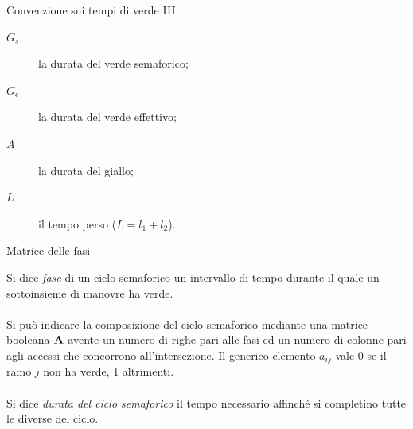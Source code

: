 \documentclass{beamer}
\begin{document}
\begin{frame}{Convenzione sui tempi di verde III}
\begin{description}
	\item[$G_s$] la durata del verde semaforico;
	\item[$G_e$] la durata del verde effettivo;
	\item[$A$] la durata del giallo;
	\item[$L$] il tempo perso ($L=l_1+l_2$).
\end{description}
\end{frame}

\begin{frame}{Matrice delle fasi}

Si dice \emph{fase} di un ciclo semaforico un intervallo di tempo durante il quale un sottoinsieme di manovre ha verde.
\\~\\
Si pu\`o indicare la composizione del ciclo semaforico mediante una matrice booleana $\mathbf{A}$ avente un numero di righe pari alle fasi ed un numero di colonne pari agli accessi che concorrono
all'intersezione. Il generico elemento $a_{ij}$ vale 0 se il ramo $j$ non ha verde, 1 altrimenti.
\\~\\
Si dice \emph{durata del ciclo semaforico} il tempo necessario affinch\'e si completino tutte le
diverse del ciclo.
\end{frame}
\end{document}
